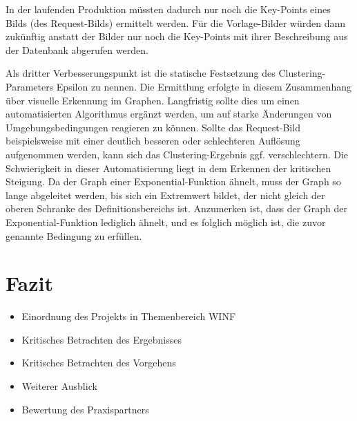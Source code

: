\documentclass[
    type=Projektarbeit,
    status=draft, %
    language=german, %
    bibengine=bibtex,
]{unibwm-inf-thesis}
\begin{document}
    In der laufenden Produktion müssten dadurch nur noch die Key-Points eines Bilds (des Request-Bilds) ermittelt werden.
    Für die Vorlage-Bilder würden dann zukünftig anstatt der Bilder nur noch die Key-Points mit ihrer Beschreibung aus der Datenbank abgerufen werden.

    Als dritter Verbesserungspunkt ist die statische Festsetzung des Clustering-Parameters Epsilon zu nennen.
    Die Ermittlung erfolgte in diesem Zusammenhang über visuelle Erkennung im Graphen.
    Langfristig sollte dies um einen automatisierten Algorithmus ergänzt werden, um auf starke Änderungen von Umgebungsbedingungen reagieren zu können.
    Sollte das Request-Bild beispielsweise mit einer deutlich besseren oder schlechteren Auflösung aufgenommen werden, kann sich das Clustering-Ergebnis ggf. verschlechtern.
    Die Schwierigkeit in dieser Automatisierung liegt in dem Erkennen der kritischen Steigung.
    Da der Graph einer Exponential-Funktion ähnelt, muss der Graph so lange abgeleitet werden, bis sich ein Extremwert bildet, der nicht gleich der oberen Schranke des Definitionsbereichs ist.
    Anzumerken ist, dass der Graph der Exponential-Funktion lediglich ähnelt, und es folglich möglich ist, die zuvor genannte Bedingung zu erfüllen.

   \chapter{Fazit}


    \begin{itemize}
        \item Einordnung des Projekts in Themenbereich WINF
        \item Kritisches Betrachten des Ergebnisses
        \item Kritisches Betrachten des Vorgehens
        \item Weiterer Ausblick
        \item Bewertung des Praxispartners
    \end{itemize}




    
    \backmatter
    
    
    
\end{document}
